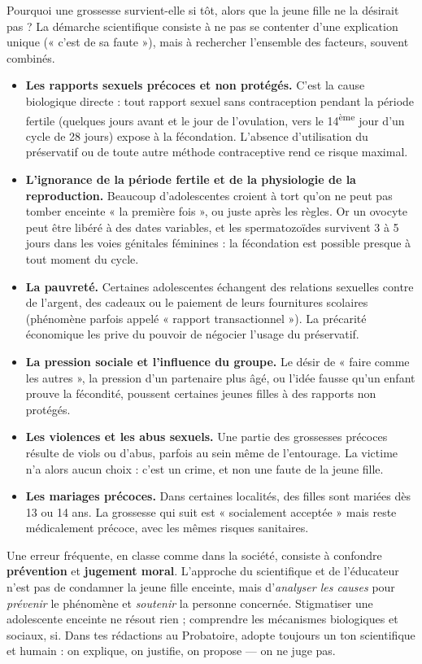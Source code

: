 \documentclass[11pt]{article}
\newcounter{popsec}
\newcounter{popsub}
\newcommand{\courssub}[1]{%
  \stepcounter{popsub}%
  \par\vspace{9pt}\noindent{\popxbold\fontsize{11.5}{13}\selectfont\color{popink}{\color{poporange}\thepopsec.\thepopsub}\hspace{6pt}#1}\par\nopagebreak\vspace{4pt}
}
\begin{document}
\courssub{Les causes des grossesses précoces}

Pourquoi une grossesse survient-elle si tôt, alors que la jeune fille ne la désirait pas ? La démarche scientifique consiste à ne pas se contenter d'une explication unique (« c'est de sa faute »), mais à rechercher l'ensemble des facteurs, souvent combinés.

\begin{itemize}
\item \textbf{Les rapports sexuels précoces et non protégés.} C'est la cause biologique directe : tout rapport sexuel sans contraception pendant la période fertile (quelques jours avant et le jour de l'ovulation, vers le 14\textsuperscript{ème} jour d'un cycle de 28 jours) expose à la fécondation. L'absence d'utilisation du préservatif ou de toute autre méthode contraceptive rend ce risque maximal.
\item \textbf{L'ignorance de la période fertile et de la physiologie de la reproduction.} Beaucoup d'adolescentes croient à tort qu'on ne peut pas tomber enceinte « la première fois », ou juste après les règles. Or un ovocyte peut être libéré à des dates variables, et les spermatozoïdes survivent 3 à 5 jours dans les voies génitales féminines : la fécondation est possible presque à tout moment du cycle.
\item \textbf{La pauvreté.} Certaines adolescentes échangent des relations sexuelles contre de l'argent, des cadeaux ou le paiement de leurs fournitures scolaires (phénomène parfois appelé « rapport transactionnel »). La précarité économique les prive du pouvoir de négocier l'usage du préservatif.
\item \textbf{La pression sociale et l'influence du groupe.} Le désir de « faire comme les autres », la pression d'un partenaire plus âgé, ou l'idée fausse qu'un enfant prouve la fécondité, poussent certaines jeunes filles à des rapports non protégés.
\item \textbf{Les violences et les abus sexuels.} Une partie des grossesses précoces résulte de viols ou d'abus, parfois au sein même de l'entourage. La victime n'a alors aucun choix : c'est un crime, et non une faute de la jeune fille.
\item \textbf{Les mariages précoces.} Dans certaines localités, des filles sont mariées dès 13 ou 14 ans. La grossesse qui suit est « socialement acceptée » mais reste médicalement précoce, avec les mêmes risques sanitaires.
\end{itemize}

\begin{attention}
Une erreur fréquente, en classe comme dans la société, consiste à confondre \textbf{prévention} et \textbf{jugement moral}. L'approche du scientifique et de l'éducateur n'est pas de condamner la jeune fille enceinte, mais d'\emph{analyser les causes} pour \emph{prévenir} le phénomène et \emph{soutenir} la personne concernée. Stigmatiser une adolescente enceinte ne résout rien ; comprendre les mécanismes biologiques et sociaux, si. Dans tes rédactions au Probatoire, adopte toujours un ton scientifique et humain : on explique, on justifie, on propose — on ne juge pas.
\end{attention}
\end{document}
